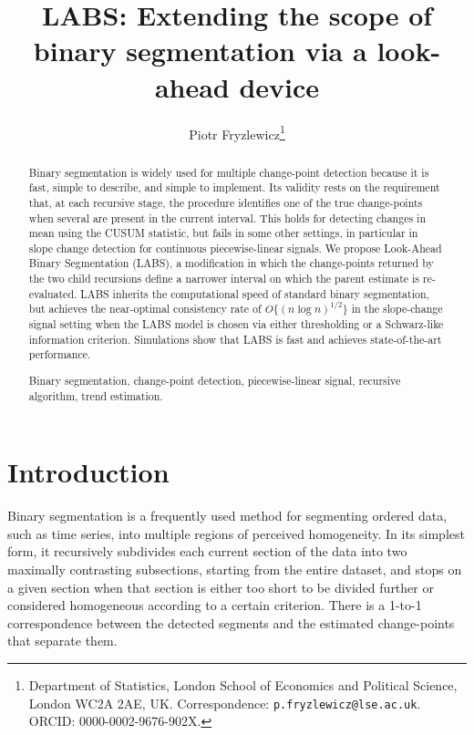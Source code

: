 \documentclass[12pt, a4paper]{article}
\begin{document}
\title{LABS: Extending the scope of binary segmentation via a look-ahead device} 
\author{Piotr Fryzlewicz\thanks{Department of Statistics, London School of Economics and Political Science, London WC2A 2AE, UK. Correspondence: \texttt{p.fryzlewicz@lse.ac.uk}. ORCID: 0000-0002-9676-902X.}}
\date{}
\maketitle

\begin{abstract}
Binary segmentation is widely used for multiple change-point detection because it is fast, simple to describe, and simple to implement. Its validity rests on the requirement that, at each recursive stage, the procedure identifies one of the true change-points when several are present in the current interval. This holds for detecting changes in mean using the CUSUM statistic, but fails in some other settings, in particular in slope change detection for continuous piecewise-linear signals. We propose Look-Ahead Binary Segmentation (LABS), a modification in which the change-points returned by the two child recursions define a narrower interval on which the parent estimate is re-evaluated. LABS inherits the computational speed of standard binary segmentation, but achieves the near-optimal consistency rate of $O\{(n\log n)^{1/2}\}$ in the slope-change signal setting when the LABS model is chosen via either thresholding or a Schwarz-like information criterion. Simulations show that LABS is fast and achieves state-of-the-art performance.
\vspace{5pt}

 Binary segmentation, change-point detection, piecewise-linear signal, recursive algorithm, trend estimation.
\end{abstract}


\section{Introduction}

Binary segmentation is a frequently used method for segmenting ordered data, such as time series, into multiple regions of perceived homogeneity. In its simplest form, it recursively subdivides each current section of the data into two maximally contrasting subsections, starting from the entire dataset, and stops on a given section when that section is either too short to be divided further or considered homogeneous according to a certain criterion. There is a 1-to-1 correspondence between the detected segments and the estimated change-points that separate them.
\end{document}
